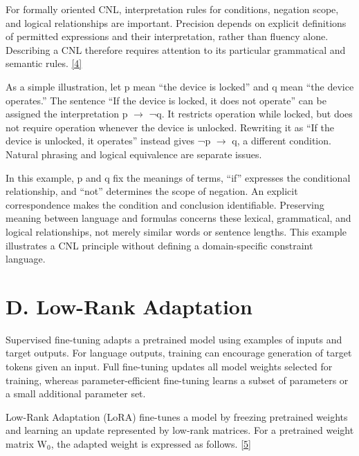 \documentclass[11pt,a4paper]{article}
\begin{document}
For formally oriented CNL, interpretation rules for conditions, negation scope, and logical relationships are important. Precision depends on explicit definitions of permitted expressions and their interpretation, rather than fluency alone. Describing a CNL therefore requires attention to its particular grammatical and semantic rules. \href{\detokenize{https://aclanthology.org/J14-1005/}}{[4]}\par

As a simple illustration, let p mean “the device is locked” and q mean “the device operates.” The sentence “If the device is locked, it does not operate” can be assigned the interpretation p \ensuremath{\rightarrow} ¬q. It restricts operation while locked, but does not require operation whenever the device is unlocked. Rewriting it as “If the device is unlocked, it operates” instead gives ¬p \ensuremath{\rightarrow} q, a different condition. Natural phrasing and logical equivalence are separate issues.\par

In this example, p and q fix the meanings of terms, “if” expresses the conditional relationship, and “not” determines the scope of negation. An explicit correspondence makes the condition and conclusion identifiable. Preserving meaning between language and formulas concerns these lexical, grammatical, and logical relationships, not merely similar words or sentence lengths. This example illustrates a CNL principle without defining a domain-specific constraint language.\par

\section*{D. Low-Rank Adaptation}

Supervised fine-tuning adapts a pretrained model using examples of inputs and target outputs. For language outputs, training can encourage generation of target tokens given an input. Full fine-tuning updates all model weights selected for training, whereas parameter-efficient fine-tuning learns a subset of parameters or a small additional parameter set.\par

Low-Rank Adaptation (LoRA) fine-tunes a model by freezing pretrained weights and learning an update represented by low-rank matrices. For a pretrained weight matrix W\ensuremath{{}_0}, the adapted weight is expressed as follows. \href{\detokenize{https://arxiv.org/abs/2106.09685}}{[5]}\par
\end{document}
